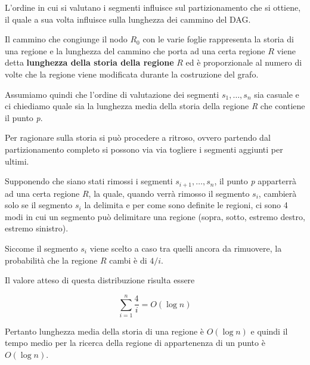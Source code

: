 L'ordine in cui si valutano i segmenti influisce sul partizionamento che si ottiene, il quale a sua volta influisce sulla lunghezza dei cammino del DAG.

Il cammino che congiunge il nodo $R_0$ con le varie foglie rappresenta la storia di una regione e la lunghezza del cammino che porta ad una certa regione $R$ viene detta \textbf{lunghezza della storia della regione} $R$ ed è proporzionale al numero di volte che la regione viene modificata durante la costruzione del grafo.

Assumiamo quindi che l'ordine di valutazione dei segmenti $s_1, \ldots, s_n$ sia casuale e ci chiediamo quale sia la lunghezza media della storia della regione \emph{R} che contiene il punto \emph{p}.

Per ragionare sulla storia si può procedere a ritroso, ovvero partendo dal partizionamento completo si possono via via togliere i segmenti aggiunti per ultimi.

Supponendo che siano stati rimossi i segmenti $s_{i+1}, \ldots, s_n$, il punto \textit{p} apparterrà ad una certa regione $ R $, la quale, quando verrà rimosso il segmento $s_i$, cambierà solo se il segmento $ s_i $ la delimita e per come sono definite le regioni, ci sono 4 modi in cui un segmento può delimitare una regione (sopra, sotto, estremo destro, estremo sinistro).

Siccome il segmento $s_i$ viene scelto a caso tra quelli ancora da rimuovere, la probabilità che la regione $ R $ cambi è di $ 4/i $.

Il valore atteso di questa distribuzione risulta essere

$$
\sum\limits_{i=1}^{n} \frac{4}{i} = O(\log n)
$$

Pertanto lunghezza media della storia di una regione è $ O(\log n) $ e quindi il tempo medio per la ricerca della regione di appartenenza di un punto è $ O(\log n) $.